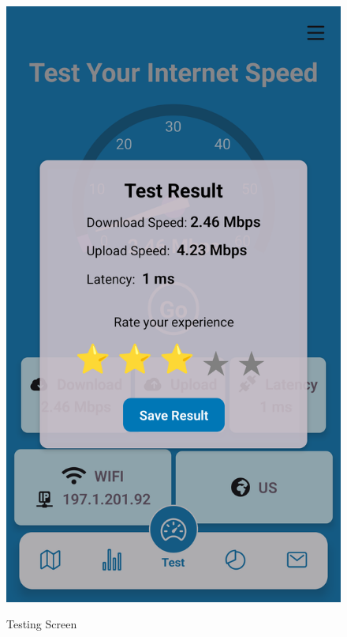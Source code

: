 \begin{figure}[H]
\begin{center}
    \begin{minipage}{0.32\textwidth}
    \includegraphics[width=\textwidth]{images/sprint2/testModuleFinish.png}
    \label{fig:enter-label}
    \end{minipage}\hfill
    \caption{Testing Screen}
\end{center}
\end{figure}


